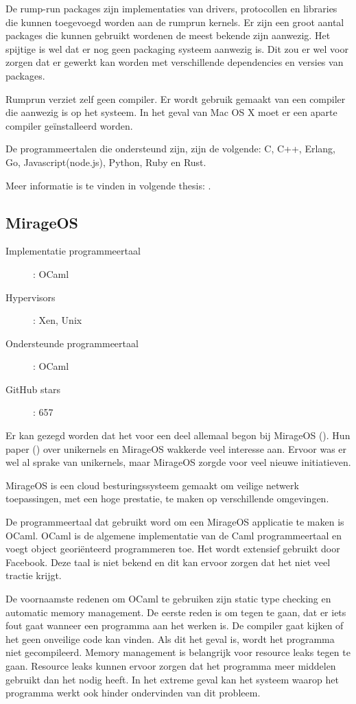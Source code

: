De rump-run packages zijn implementaties van drivers, protocollen en libraries die kunnen toegevoegd worden aan de rumprun kernels. Er zijn een groot aantal packages die kunnen gebruikt wordenen de meest bekende zijn aanwezig.
Het spijtige is wel dat er nog geen packaging systeem aanwezig is. Dit zou er wel voor zorgen dat er gewerkt kan worden met verschillende dependencies en versies van packages.

Rumprun verziet zelf geen compiler. Er wordt gebruik gemaakt van een compiler die aanwezig is op het systeem. In het geval van Mac OS X moet er een aparte compiler geïnstalleerd worden.

De programmeertalen die ondersteund zijn, zijn de volgende: C, C++, Erlang, Go, Javascript(node.js), Python, Ruby en Rust.

Meer informatie is te vinden in volgende thesis: \cite{kantee_flexible_2012}.

\subsection{MirageOS}

\begin{description}
  \item [Implementatie programmeertaal]: OCaml
  \item [Hypervisors]: Xen, Unix
  \item [Ondersteunde programmeertaal]: OCaml
  \item [GitHub stars]: 657
\end{description}

Er kan gezegd worden dat het voor een deel allemaal begon bij MirageOS (\cite{mirage/mirage_0000}). Hun paper (\cite{madhavapeddy_unikernels_2013}) over unikernels en MirageOS wakkerde veel interesse aan. Ervoor was er wel al sprake van unikernels, maar MirageOS zorgde voor veel nieuwe initiatieven.

MirageOS is een cloud besturingssysteem gemaakt om veilige netwerk toepassingen, met een hoge prestatie, te maken op verschillende omgevingen.

De programmeertaal dat gebruikt word om een MirageOS applicatie te maken is OCaml.
OCaml is de algemene implementatie van de Caml programmeertaal en voegt object georiënteerd programmeren toe. Het wordt extensief gebruikt door Facebook. Deze taal is niet bekend en dit kan ervoor zorgen dat het niet veel tractie krijgt.

De voornaamste redenen om OCaml te gebruiken zijn static type checking en automatic memory management. De eerste reden is om tegen te gaan, dat er iets fout gaat wanneer een programma aan het werken is. De compiler gaat kijken of het geen onveilige code kan vinden. Als dit het geval is, wordt het programma niet gecompileerd.
Memory management is belangrijk voor resource leaks tegen te gaan. Resource leaks kunnen ervoor zorgen dat het programma meer middelen gebruikt dan het nodig heeft. In het extreme geval kan het systeem waarop het programma werkt ook hinder ondervinden van dit probleem.

